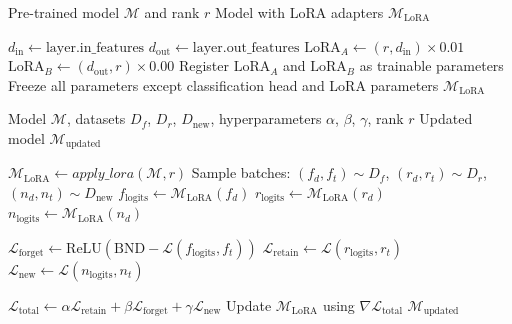 \begin{algorithm}[htbp]
\caption{\textit{apply\_lora()}}
\label{algo:apply_lora}
\begin{algorithmic}[1]
\REQUIRE Pre-trained model $\mathcal{M}$ and rank $r$
\ENSURE Model with LoRA adapters $\mathcal{M}_{\text{LoRA}}$

        \STATE $d_{\text{in}} \leftarrow \text{layer.in\_features}$
        \STATE $d_{\text{out}} \leftarrow \text{layer.out\_features}$
        \STATE $\text{LoRA}_A \leftarrow (r, d_{\text{in}}) \times 0.01$
        \STATE $\text{LoRA}_B \leftarrow (d_{\text{out}}, r) \times 0.00$
        \STATE Register $\text{LoRA}_A$ and $\text{LoRA}_B$ as trainable parameters
    \ENDIF
\ENDFOR
\STATE Freeze all parameters except classification head and LoRA parameters
\RETURN $\mathcal{M}_{\text{LoRA}}$
\end{algorithmic}
\end{algorithm}

\begin{algorithm}[htbp]
\caption{\textit{single\_step()}}
\label{algo:single_step}
\begin{algorithmic}[1]
\REQUIRE Model $\mathcal{M}$, datasets $D_f$, $D_r$, $D_{\text{new}}$, hyperparameters $\alpha$, $\beta$, $\gamma$, rank $r$
\ENSURE Updated model $\mathcal{M}_{\text{updated}}$

\STATE $\mathcal{M}_{\text{LoRA}} \leftarrow \textit{apply\_lora}(\mathcal{M}, r)$
    \STATE Sample batches: $(f_d, f_t) \sim D_f$, $(r_d, r_t) \sim D_r$, $(n_d, n_t) \sim D_{\text{new}}$
    \STATE $f_{\text{logits}} \leftarrow \mathcal{M}_{\text{LoRA}}(f_d)$
    \STATE $r_{\text{logits}} \leftarrow \mathcal{M}_{\text{LoRA}}(r_d)$
    \STATE $n_{\text{logits}} \leftarrow \mathcal{M}_{\text{LoRA}}(n_d)$
    
    \STATE $\mathcal{L}_{\text{forget}} \leftarrow \text{ReLU}(\text{BND} - \mathcal{L}(f_{\text{logits}}, f_t))$
    \STATE $\mathcal{L}_{\text{retain}} \leftarrow \mathcal{L}(r_{\text{logits}}, r_t)$
    \STATE $\mathcal{L}_{\text{new}} \leftarrow \mathcal{L}(n_{\text{logits}}, n_t)$
    
    \STATE $\mathcal{L}_{\text{total}} \leftarrow \alpha \mathcal{L}_{\text{retain}} + \beta \mathcal{L}_{\text{forget}} + \gamma \mathcal{L}_{\text{new}}$
    \STATE Update $\mathcal{M}_{\text{LoRA}}$ using $\nabla \mathcal{L}_{\text{total}}$
\ENDFOR
\RETURN $\mathcal{M}_{\text{updated}}$
\end{algorithmic}
\end{algorithm}


